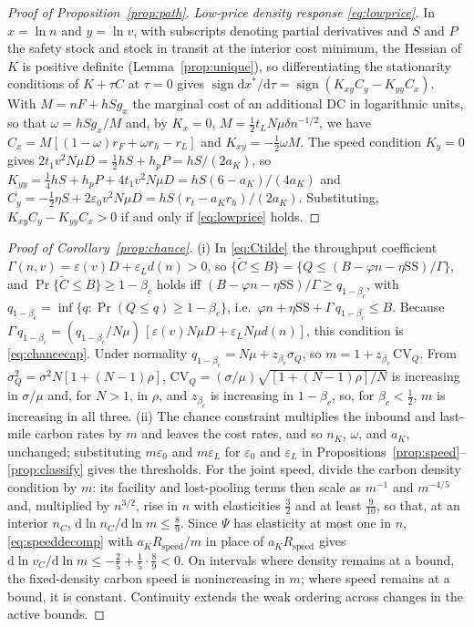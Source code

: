 \documentclass[11pt]{article}
\numberwithin{proposition}{section}
\theoremstyle{definition}
\theoremstyle{remark}
\theoremstyle{plain}
\newcommand{\sstock}{\mathrm{SS}}
\begin{document}
\begin{proof}[Proof of Proposition~\ref{prop:path}]
\emph{Low-price density response \eqref{eq:lowprice}.} In $x=\ln n$ and $y=\ln v$, with subscripts denoting
partial derivatives and $S$ and $P$ the safety stock and stock in transit at the interior cost minimum, the Hessian
of $K$ is positive definite (Lemma~\ref{prop:unique}), so differentiating the stationarity
conditions of $K+\tau C$ at $\tau=0$ gives $\operatorname{sign}\mathrm dx^*/\mathrm d\tau=\operatorname{sign}
(K_{xy}C_y-K_{yy}C_x)$. With $M=nF+hSg_x$ the marginal cost of an additional DC in logarithmic units, so that
$\omega=hSg_x/M$ and, by $K_x=0$, $M=\tfrac12t_LN\mu\delta n^{-1/2}$, we have $C_x=M[(1-\omega)r_F+\omega
r_h-r_L]$ and $K_{xy}=-\tfrac12\omega M$. The speed condition $K_y=0$ gives $2t_1v^2N\mu D=\tfrac12hS+h_pP=hS/(2a_K)$,
so $K_{yy}=\tfrac14hS+h_pP+4t_1v^2N\mu D=hS(6-a_K)/(4a_K)$ and $C_y=-\tfrac12\eta S+2\varepsilon_0v^2N\mu
D=hS(r_t-a_Kr_h)/(2a_K)$. Substituting, $K_{xy}C_y-K_{yy}C_x>0$ if and only if \eqref{eq:lowprice} holds.
\end{proof}

\begin{proof}[Proof of Corollary~\ref{prop:chance}]
(i) In \eqref{eq:Ctilde} the throughput coefficient $\Gamma(n,v)=\varepsilon(v)D+\varepsilon_L d(n)>0$, so
$\{\tilde C\le B\}=\{Q\le(B-\varphi n-\eta\sstock)/\Gamma\}$, and $\Pr\{\tilde C\le B\}\ge 1-\beta_c$ holds iff
$(B-\varphi n-\eta\sstock)/\Gamma\ge q_{1-\beta_c}$, with $q_{1-\beta_c}=\inf\{q:\Pr(Q\le q)\ge1-\beta_c\}$, i.e.\
$\varphi n+\eta\sstock+\Gamma\,q_{1-\beta_c}\le B$. Because
$\Gamma\,q_{1-\beta_c}=(q_{1-\beta_c}/N\mu)\,[\varepsilon(v)N\mu D+\varepsilon_L N\mu d(n)]$, this condition is
\eqref{eq:chancecap}. Under normality $q_{1-\beta_c}=N\mu+z_{\beta_c}\sigma_Q$, so $m=1+z_{\beta_c}\,\mathrm{CV}_Q$.
From $\sigma_Q^2=\sigma^2N[1+(N-1)\rho]$, $\mathrm{CV}_Q=(\sigma/\mu)\sqrt{[1+(N-1)\rho]/N}$ is increasing in
$\sigma/\mu$ and, for $N>1$, in $\rho$, and $z_{\beta_c}$ is increasing in $1-\beta_c$, so, for $\beta_c<\tfrac12$, $m$ is increasing in all
three.
(ii) The chance constraint multiplies the inbound and last-mile carbon rates by $m$ and leaves the cost rates,
and so $n_K$, $\omega$, and $a_K$, unchanged; substituting $m\varepsilon_0$ and $m\varepsilon_L$ for
$\varepsilon_0$ and $\varepsilon_L$ in Propositions~\ref{prop:speed}--\ref{prop:classify} gives the thresholds. For the joint speed, divide the carbon density condition by $m$: its facility and
lost-pooling terms then scale as $m^{-1}$ and $m^{-4/5}$ and, multiplied by $n^{3/2}$, rise in $n$ with
elasticities $\tfrac32$ and at least $\tfrac9{10}$, so that, at an interior $n_C$,
$\mathrm d\ln n_C/\mathrm d\ln m\le\tfrac89$. Since $\Psi$ has elasticity at most one in $n$,
\eqref{eq:speeddecomp} with $a_KR_{\mathrm{speed}}/m$ in place of $a_KR_{\mathrm{speed}}$ gives
$\mathrm d\ln v_C/\mathrm d\ln m\le-\tfrac25+\tfrac15\cdot\tfrac89<0$.
On intervals where density remains at a bound, the fixed-density carbon speed is nonincreasing in $m$; where
speed remains at a bound, it is constant. Continuity extends the weak ordering across changes in the active bounds.
\end{proof}
\end{document}
